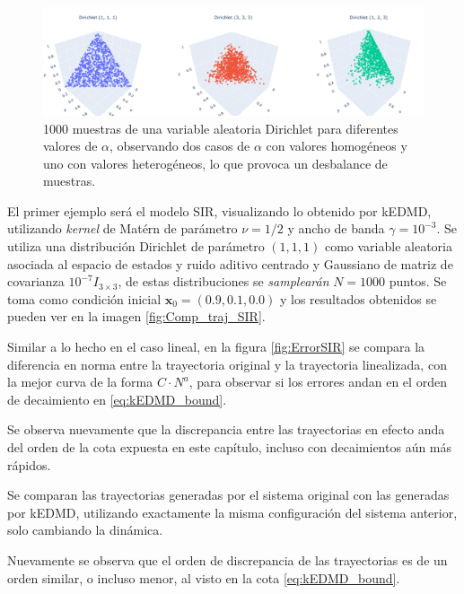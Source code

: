 \begin{figure}[htbp]
    \centering
    \includegraphics[width=0.95\linewidth]{img/content/chapter3/Dirichlet.pdf}
    \caption{1000 muestras de una variable aleatoria Dirichlet para diferentes valores de $\alpha$, observando dos casos de $\alpha$ con valores homogéneos y uno con valores heterogéneos, lo que provoca un desbalance de muestras.}
    \label{fig:Dirichlet_samples}
\end{figure}

El primer ejemplo será el modelo SIR, visualizando lo obtenido por kEDMD, utilizando \textit{kernel} de Matérn de parámetro $\nu=1/2$ y ancho de banda $\gamma=10^{-3}$. Se utiliza una distribución Dirichlet de parámetro $(1,1,1)$ como variable aleatoria asociada al espacio de estados y ruido aditivo centrado y Gaussiano de matriz de covarianza $10^{-7} I_{3 \times 3}$, de estas distribuciones se \textit{samplearán} $N=1000$ puntos. Se toma como condición inicial $\mathbf{x}_0 = (0.9, 0.1, 0.0)$ y los resultados obtenidos se pueden ver en la imagen \ref{fig:Comp_traj_SIR}. 

Similar a lo hecho en el caso lineal, en la figura \ref{fig:ErrorSIR} se compara la diferencia en norma entre la trayectoria original y la trayectoria linealizada, con la mejor curva de la forma $C \cdot N^{a}$, para observar si los errores andan en el orden de decaimiento en \eqref{eq:kEDMD_bound}.

Se observa nuevamente que la discrepancia entre las trayectorias en efecto anda del orden de la cota expuesta en este capítulo, incluso con decaimientos aún más rápidos.

Se comparan las trayectorias generadas por el sistema original con las generadas por kEDMD, utilizando exactamente la misma configuración del sistema anterior, solo cambiando la dinámica.

Nuevamente se observa que el orden de discrepancia de las trayectorias es de un orden similar, o incluso menor, al visto en la cota \ref{eq:kEDMD_bound}.